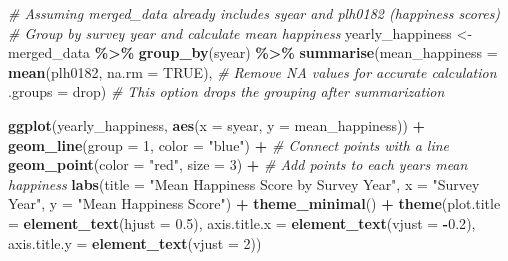 \documentclass[
]{article}
\newenvironment{Shaded}{\begin{snugshade}}{\end{snugshade}}
\newcommand{\AttributeTok}[1]{\textcolor[rgb]{0.13,0.29,0.53}{#1}}
\newcommand{\CommentTok}[1]{\textcolor[rgb]{0.56,0.35,0.01}{\textit{#1}}}
\newcommand{\ConstantTok}[1]{\textcolor[rgb]{0.56,0.35,0.01}{#1}}
\newcommand{\DecValTok}[1]{\textcolor[rgb]{0.00,0.00,0.81}{#1}}
\newcommand{\FloatTok}[1]{\textcolor[rgb]{0.00,0.00,0.81}{#1}}
\newcommand{\FunctionTok}[1]{\textcolor[rgb]{0.13,0.29,0.53}{\textbf{#1}}}
\newcommand{\NormalTok}[1]{#1}
\newcommand{\OtherTok}[1]{\textcolor[rgb]{0.56,0.35,0.01}{#1}}
\newcommand{\SpecialCharTok}[1]{\textcolor[rgb]{0.81,0.36,0.00}{\textbf{#1}}}
\newcommand{\StringTok}[1]{\textcolor[rgb]{0.31,0.60,0.02}{#1}}
\begin{document}
\begin{Shaded}
\begin{Highlighting}[]
\CommentTok{\# Assuming merged\_data already includes \textquotesingle{}syear\textquotesingle{} and \textquotesingle{}plh0182\textquotesingle{} (happiness scores)}
\CommentTok{\# Group by survey year and calculate mean happiness}
\NormalTok{yearly\_happiness }\OtherTok{\textless{}{-}}\NormalTok{ merged\_data }\SpecialCharTok{\%\textgreater{}\%}
  \FunctionTok{group\_by}\NormalTok{(syear) }\SpecialCharTok{\%\textgreater{}\%}
  \FunctionTok{summarise}\NormalTok{(}\AttributeTok{mean\_happiness =} \FunctionTok{mean}\NormalTok{(plh0182, }\AttributeTok{na.rm =} \ConstantTok{TRUE}\NormalTok{),  }\CommentTok{\# Remove NA values for accurate calculation}
            \AttributeTok{.groups =} \StringTok{\textquotesingle{}drop\textquotesingle{}}\NormalTok{)  }\CommentTok{\# This option drops the grouping after summarization}


\FunctionTok{ggplot}\NormalTok{(yearly\_happiness, }\FunctionTok{aes}\NormalTok{(}\AttributeTok{x =}\NormalTok{ syear, }\AttributeTok{y =}\NormalTok{ mean\_happiness)) }\SpecialCharTok{+}
  \FunctionTok{geom\_line}\NormalTok{(}\AttributeTok{group =} \DecValTok{1}\NormalTok{, }\AttributeTok{color =} \StringTok{"blue"}\NormalTok{) }\SpecialCharTok{+}  \CommentTok{\# Connect points with a line}
  \FunctionTok{geom\_point}\NormalTok{(}\AttributeTok{color =} \StringTok{"red"}\NormalTok{, }\AttributeTok{size =} \DecValTok{3}\NormalTok{) }\SpecialCharTok{+}  \CommentTok{\# Add points to each year\textquotesingle{}s mean happiness}
  \FunctionTok{labs}\NormalTok{(}\AttributeTok{title =} \StringTok{"Mean Happiness Score by Survey Year"}\NormalTok{,}
       \AttributeTok{x =} \StringTok{"Survey Year"}\NormalTok{,}
       \AttributeTok{y =} \StringTok{"Mean Happiness Score"}\NormalTok{) }\SpecialCharTok{+}
  \FunctionTok{theme\_minimal}\NormalTok{() }\SpecialCharTok{+}
  \FunctionTok{theme}\NormalTok{(}\AttributeTok{plot.title =} \FunctionTok{element\_text}\NormalTok{(}\AttributeTok{hjust =} \FloatTok{0.5}\NormalTok{),}
        \AttributeTok{axis.title.x =} \FunctionTok{element\_text}\NormalTok{(}\AttributeTok{vjust =} \SpecialCharTok{{-}}\FloatTok{0.2}\NormalTok{),}
        \AttributeTok{axis.title.y =} \FunctionTok{element\_text}\NormalTok{(}\AttributeTok{vjust =} \DecValTok{2}\NormalTok{))}
\end{Highlighting}
\end{Shaded}
\end{document}

